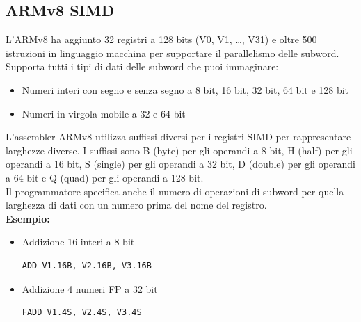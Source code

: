 \documentclass[12pt,a4paper]{article}
\begin{document}
\subsection{ARMv8 SIMD}
L'ARMv8 ha aggiunto 32 registri a 128 bits (V0, V1, \dots, V31) e oltre 500 istruzioni in linguaggio macchina per supportare il parallelismo delle subword.\\
Supporta tutti i tipi di dati delle subword che puoi immaginare:
\begin{itemize}
\item Numeri interi con segno e senza segno a 8 bit, 16 bit, 32 bit, 64 bit e 128 bit
\item Numeri in virgola mobile a 32 e 64 bit
\end{itemize}
L'assembler ARMv8 utilizza suffissi diversi per i registri SIMD per rappresentare larghezze diverse. I suffissi sono B (byte) per gli operandi a 8 bit, H (half) per gli operandi a 16 bit, S (single) per gli operandi a 32 bit, D (double) per gli operandi a 64 bit e Q (quad) per gli operandi a 128 bit.\\
Il programmatore specifica anche il numero di operazioni di subword per quella larghezza di dati con un numero prima del nome del registro.\\
\textbf{Esempio:}
\begin{itemize}
\item Addizione 16 interi a 8 bit
\begin{center}
\begin{minipage}{.4\linewidth}
\begin{verbatim}
ADD V1.16B, V2.16B, V3.16B
\end{verbatim}
\end{minipage}
\end{center}
\item Addizione 4 numeri FP a 32 bit
\begin{center}
\begin{minipage}{.4\linewidth}
\begin{verbatim}
FADD V1.4S, V2.4S, V3.4S
\end{verbatim}
\end{minipage}
\end{center}
\end{itemize}
\end{document}
